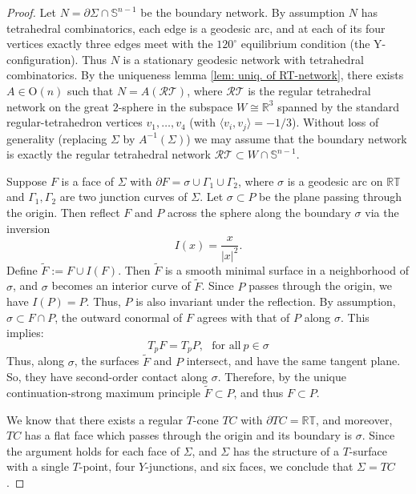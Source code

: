 \documentclass[10pt,a4paper]{amsart}
\begin{document}
\begin{proof}
Let \(N = \partial \Sigma \cap \mathbb{S}^{n-1}\) be the boundary network. By assumption \(N\) has tetrahedral combinatorics, each edge is a geodesic arc, and at each of its four vertices exactly three edges meet with the \(120^\circ\) equilibrium condition (the Y-configuration). Thus \(N\) is a stationary geodesic network with tetrahedral combinatorics. By the uniqueness lemma \ref{lem: uniq. of RT-network}, there exists \(A \in \mathrm{O}(n)\) such that \(N = A(\mathcal{RT})\), where \(\mathcal{RT}\) is the regular tetrahedral network on the great \(2\)-sphere in the subspace \(W \cong \mathbb{R}^3\) spanned by the standard regular-tetrahedron vertices \(v_1,\dots,v_4\) (with \(\langle v_i,v_j\rangle = -1/3\)). Without loss of generality (replacing \(\Sigma\) by \(A^{-1}(\Sigma)\)) we may assume that the boundary network is exactly the regular tetrahedral network \(\mathcal{RT} \subset W \cap \mathbb{S}^{n-1}\).
\medskip


Suppose $F$ is a face of $\Sigma$ with $\partial F=\sigma \cup \Gamma_1 \cup \Gamma_2$, where $\sigma$ is a geodesic arc on $\mathbb{RT}$ and $\Gamma_1,\Gamma_2$ are two junction curves of $\Sigma$. Let $\sigma\subset P$ be the plane passing through the origin. Then reflect $F$ and $P$ across the sphere along the boundary $\sigma$ via the inversion
$$
I(x)=\frac{x}{\vert x\vert^2}.
$$
Define $\widetilde{F}:=F\cup I(F).$
Then $\widetilde{F}$ is a smooth minimal surface in a neighborhood of $\sigma$, and $\sigma$ becomes an interior curve of $\widetilde{F}$. Since $P$ passes through the origin, we have $I(P)=P$. Thus, $P$ is also invariant under the reflection. By assumption, $\sigma \subset F \cap P$,
the outward conormal of $F$ agrees with that of $P$ along $\sigma$. This implies:
$$
T_pF=T_pP,\ \ \ \text{for all}\ p\in \sigma
$$
Thus, along $\sigma$, the surfaces $\widetilde{F}$ and $P$ intersect, and have the same tangent plane. So, they have second-order contact along $\sigma$. Therefore, by the unique continuation-strong maximum principle $\widetilde{F}\subset P$, and thus $F\subset P$.
\medskip

We know that there exists a regular $T$-cone $TC$ with $\partial TC=\mathbb{RT}$, and moreover, $TC$ has a flat face which passes through the origin and its boundary is $\sigma$. Since the argument holds for each face of $\Sigma$, and $\Sigma$ has the structure of a $T$-surface with a single $T$-point, four $Y$-junctions, and six faces, we conclude that $\Sigma=TC$. 
\medskip



\end{proof}
\end{document}
